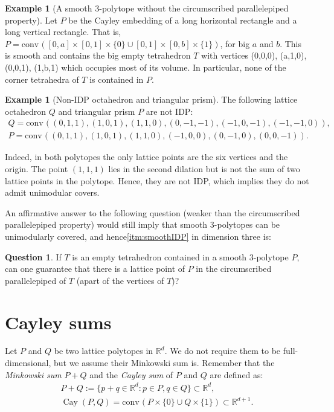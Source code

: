 \documentclass{amsart}
\theoremstyle{plain}
\theoremstyle{definition}
\newtheorem{example}[theorem]{Example}
\newtheorem{question}[theorem]{Question}
\newcommand{\R}{ \ensuremath{\mathbb{R}}}
\newcommand{\conv}{\ensuremath{\mathrm{conv}}\hspace{1pt}}
\newcommand{\cayley}{\operatorname{Cay}}
\begin{document}
\begin{example}[A smooth 3-polytope without the circumscribed parallelepiped property]
 Let $P$ be the Cayley embedding of a long horizontal rectangle and a long vertical rectangle. That is,
$P=\conv([0,a]\times [0,1] \times\{0\} \cup [0,1]\times [0,b] \times\{1\})$, for big $a$ and $b$. This is smooth and contains the big empty tetrahedron $T$ with vertices (0,0,0), (a,1,0), (0,0,1), (1,b,1) which occupies most of its volume. In particular, none of the corner tetrahedra of $T$ is contained in $P$.
\end{example}



\begin{example}[Non-IDP octahedron and triangular prism]
\label{ex:non-IDP}
The following lattice octahedron $Q$ and triangular prism $P$ are not IDP:
\begin{gather}
Q= \conv((0,1,1),(1,0,1),(1,1,0),(0,-1,-1),(-1,0,-1),(-1,-1,0)),\\
P=\conv((0,1,1),(1,0,1),(1,1,0),(-1,0,0),(0,-1,0),(0,0,-1)).
\end{gather}

Indeed, in both polytopes the only lattice points are the six vertices and the origin. The point $(1,1,1)$ lies in the second dilation but is not the sum of two lattice points in the polytope. Hence, they are not IDP, which implies they do not admit unimodular covers.
\end{example}

An affirmative answer to the following question (weaker than the circumscribed parallelepiped property) would still  imply that smooth $3$-polytopes can be unimodularly covered, and hence\eqref{itm:smoothIDP} in dimension three is:

\begin{question}
If $T$ is an empty tetrahedron contained in a smooth 3-polytope $P$, can one guarantee that there is a lattice point of $P$ in the circumscribed parallelepiped of $T$ (apart of the vertices of $T$)?
\end{question}




\section{ Cayley sums}
\label{sec:cayley}
Let $P$ and $Q$ be two lattice polytopes in $\R^d$. We do not require them to be full-dimensional, but we assume their Minkowski sum is. Remember that the \emph{Minkowski sum} $P+Q$ and the \emph{Cayley sum} of $P$ and $Q$ are defined as:
\begin{gather*}
P + Q := \{ p+q \in \R^d: p\in P, q \in Q\} \subset \R^d,\\
\cayley (P,Q) = \conv( P\times\{0\} \cup Q\times \{1\}) \subset \R^{d+1}.
\end{gather*}
\end{document}
